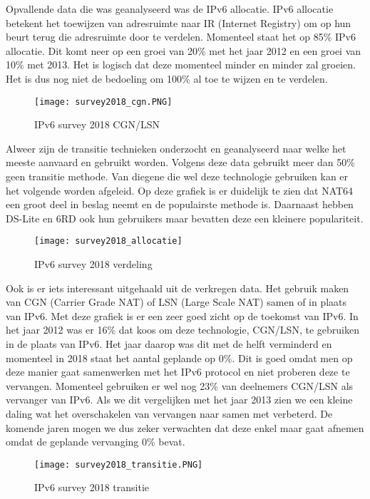 Opvallende data die was geanalyseerd was de IPv6 allocatie. IPv6 allocatie betekent het toewijzen van adresruimte naar IR (Internet Registry) om op hun beurt terug die adresruimte door te verdelen. Momenteel staat het op 85\% IPv6 allocatie. Dit komt neer op een groei van 20\% met het jaar 2012 en een groei van 10\% met 2013. Het is logisch dat deze momenteel minder en minder zal groeien. Het is dus nog niet de bedoeling om 100\% al toe te wijzen en te verdelen.

\begin{figure}
\centering
\texttt{[image: survey2018\_cgn.PNG]}
\caption{IPv6 survey 2018 CGN/LSN \autocite{Massimiliano2018}}
\end{figure}

Alweer zijn de transitie technieken onderzocht en geanalyseerd naar welke het meeste aanvaard en gebruikt worden. Volgens deze data gebruikt meer dan 50\% geen transitie methode. Van diegene die wel deze technologie gebruiken kan er het volgende worden afgeleid. Op deze grafiek is er duidelijk te zien dat NAT64 een groot deel in beslag neemt en de populairste methode is. Daarnaast hebben DS-Lite en 6RD ook hun gebruikers maar bevatten deze een kleinere populariteit.

\begin{figure}
\centering
\texttt{[image: survey2018\_allocatie]}
\caption{IPv6 survey 2018 verdeling \autocite{Massimiliano2018}}
\end{figure}

Ook is er iets interessant uitgehaald uit de verkregen data. Het gebruik maken van CGN (Carrier Grade NAT) of LSN (Large Scale NAT) samen of in plaats van IPv6. Met deze grafiek is er een zeer goed zicht op de toekomst van IPv6. In het jaar 2012 was er 16\% dat koos om deze technologie, CGN/LSN, te gebruiken in de plaats van IPv6. Het jaar daarop was dit met de helft verminderd en momenteel in 2018 staat het aantal geplande op 0\%. Dit is goed omdat men op deze manier gaat samenwerken met het IPv6 protocol en niet proberen deze te vervangen. Momenteel gebruiken er wel nog 23\% van deelnemers CGN/LSN als vervanger van IPv6. Als we dit vergelijken met het jaar 2013 zien we een kleine daling wat het overschakelen van vervangen naar samen met verbeterd. De komende jaren mogen we dus zeker verwachten dat deze enkel maar gaat afnemen omdat de geplande vervanging 0\% bevat.

\begin{figure}
\centering
\texttt{[image: survey2018\_transitie.PNG]}
\caption{IPv6 survey 2018 transitie \autocite{Massimiliano2018}}
\end{figure}

